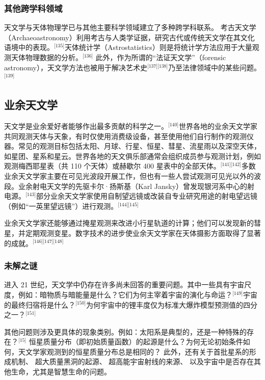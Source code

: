 \subsubsection{其他跨学科领域}
天文学与天体物理学已与其他主要科学领域建立了多种跨学科联系。  
考古天文学（Archaeoastronomy）利用考古与人类学证据，研究古代或传统天文学在其文化语境中的表现。\(^\text{[135]}\)天体统计学（Astrostatistics）则是将统计学方法应用于大量观测天体物理数据的分析。\(^\text{[136]}\) 此外，作为所谓的“法证天文学”（forensic astronomy），天文学方法也被用于解决艺术史\(^\text{[137][138]}\)乃至法律领域中的某些问题。\(^\text{[139]}\)
\subsection{业余天文学}
天文学是业余爱好者能够作出最多贡献的科学之一。\(^\text{[140]}\)世界各地的业余天文学家共同观测天体与天象，有时仅使用消费级设备，甚至使用他们自行制作的观测仪器。常见的观测目标包括太阳、月球、行星、恒星、彗星、流星雨以及深空天体，如星团、星系和星云。世界各地的天文俱乐部通常会组织成员参与观测计划，例如观测梅西耶星表（共 110 个天体）或赫歇尔 400 星表中的全部天体。\(^\text{[141][142]}\)多数业余天文学家主要在可见光波段开展工作，但也有一些人尝试观测可见光以外的波段。业余射电天文学的先驱卡尔·扬斯基（Karl Jansky）曾发现银河系中心的射电源。\(^\text{[143]}\)部分业余天文学家使用自制望远镜或改装自专业研究用途的射电望远镜（例如“一英里望远镜”）进行观测。\(^\text{[144][145]}\)

业余天文学家还能够通过掩星观测来改进小行星轨道的计算；他们可以发现新的彗星，并定期观测变星。数字技术的进步使业余天文学家在天体摄影方面取得了显著的成就。\(^\text{[146][147][148]}\)
\subsubsection{未解之谜}
进入 21 世纪，天文学中仍存在许多尚未回答的重要问题。其中一些具有宇宙尺度，例如：暗物质与暗能量是什么？它们为何主宰着宇宙的演化与命运？\(^\text{[149]}\)宇宙的最终归宿将是什么？\(^\text{[150]}\)为何宇宙中的锂丰度仅为标准大爆炸模型预测值的四分之一？\(^\text{[151]}\)  

其他问题则涉及更具体的现象类别。例如：太阳系是典型的，还是一种特殊的存在？\(^\text{[15]}\)
恒星质量分布（即初始质量函数）的起源是什么？为何无论初始条件如何，天文学家观测到的恒星质量分布总是相同的？\cite{ref153}  
此外，还有关于首批星系的形成机制、\cite{ref154} 超大质量黑洞的起源、\cite{ref155} 超高能宇宙射线的来源、\cite{ref156} 以及宇宙中是否存在其他生命，尤其是智慧生命的问题。\cite{ref157,ref158}
